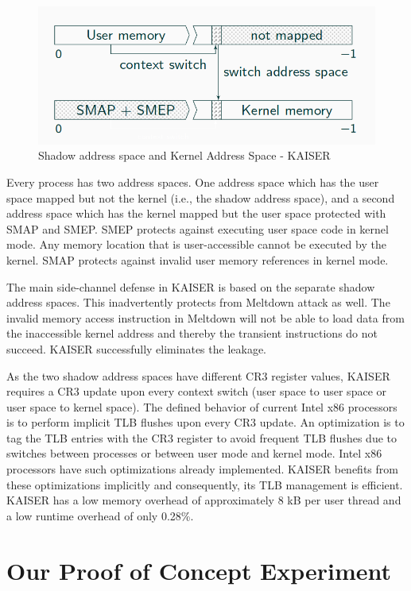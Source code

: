 \documentclass[runningheads]{llncs}
\begin{document}
\begin{figure}[H]
\centerline{\includegraphics[scale=0.45]{images/kaiser.png}}
\caption{Shadow address space and Kernel Address Space - KAISER} \label{kaiser}
\end{figure}

Every process has two address spaces. One address space which has the user space mapped but not the kernel (i.e., the shadow address space), and a second address space which has the kernel mapped but the user space protected with SMAP and SMEP. SMEP protects against executing user space code in kernel mode. Any memory location that is user-accessible cannot be executed by the kernel. SMAP protects against invalid user memory references in kernel mode.
	
The main side-channel defense in KAISER is based on the separate shadow address spaces. This inadvertently protects from Meltdown attack as well. The invalid memory access instruction in Meltdown will not be able to load data from the inaccessible kernel address and thereby the transient instructions do not succeed. KAISER successfully eliminates the leakage.
	
As the two shadow address spaces have different CR3 register values, KAISER requires a CR3 update upon every context switch (user space to user space or user space to kernel space). The defined behavior of current Intel x86 processors is to perform implicit TLB flushes upon every CR3 update. An optimization is to tag the TLB entries with the CR3 register to avoid frequent TLB flushes due to switches between processes or between user mode and kernel mode. Intel x86 processors have such optimizations already implemented. KAISER benefits from these optimizations implicitly and consequently, its TLB management is efficient. KAISER has a low memory overhead of approximately 8 kB per user thread and a low runtime overhead of only 0.28\%.

\section{Our Proof of Concept Experiment}
\end{document}
